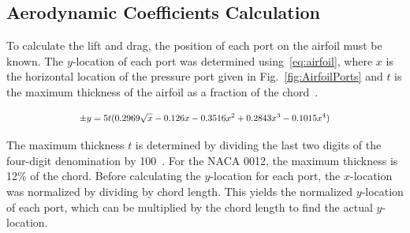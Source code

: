 \documentclass[journal,letterpaper]{IEEEtran}
\begin{document}
\subsection{Aerodynamic Coefficients Calculation}

To calculate the lift and drag, the position of each port on the airfoil must be known.
The $y$-location of each port was determined using~\eqref{eq:airfoil}, where $x$ is the horizontal location of the pressure port given in Fig.~\ref{fig:AirfoilPorts} and $t$ is the maximum thickness of the airfoil as a fraction of the chord~\cite{AirfoilEq}.

\begin{equation} \label{eq:airfoil}
    \resizebox{227pt}{!}{$\displaystyle{\pm y = 5t(0.2969\sqrt{x} - 0.126x - 0.3516x^2 + 0.2843x^3 - 0.1015x^4)}$}
\end{equation}

The maximum thickness $t$ is determined by dividing the last two digits of the four-digit denomination by 100~\cite{AirfoilEq}.
For the NACA 0012, the maximum thickness is 12\% of the chord.
Before calculating the $y$-location for each port, the $x$-location was normalized by dividing by chord length.
This yields the normalized $y$-location of each port, which can be multiplied by the chord length to find the actual $y$-location.
\end{document}
